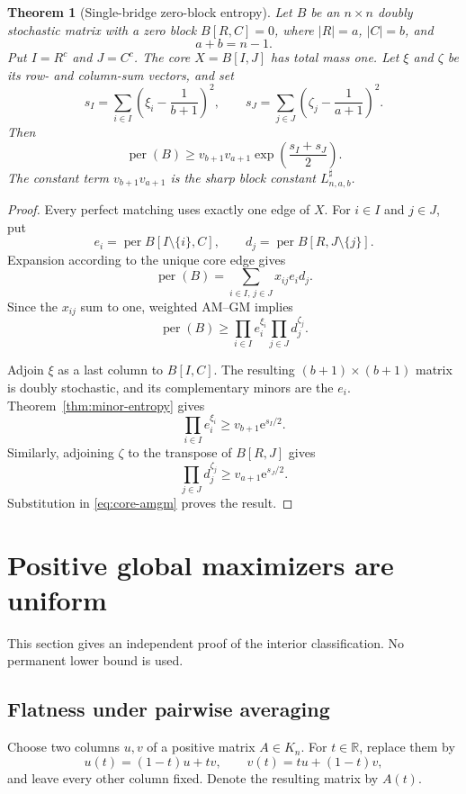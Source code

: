 \documentclass[11pt]{article}
\newtheorem{theorem}{Theorem}[section]
\theoremstyle{definition}
\newcommand{\per}{\operatorname{per}}
\newcommand{\1}{\mathbf{1}}
\newcommand{\e}{\mathrm{e}}
\begin{document}
\begin{theorem}[Single-bridge zero-block entropy]\label{thm:single-bridge-entropy}
Let $B$ be an $n\times n$ doubly stochastic matrix with a zero block
$B[R,C]=0$, where $|R|=a$, $|C|=b$, and
\[
 a+b=n-1.
\]
Put $I=R^c$ and $J=C^c$.  The core $X=B[I,J]$ has total mass one.  Let
$\xi$ and $\zeta$ be its row- and column-sum vectors, and set
\[
 s_I=\sum_{i\in I}\left(\xi_i-\frac1{b+1}\right)^2,
 \qquad
 s_J=\sum_{j\in J}\left(\zeta_j-\frac1{a+1}\right)^2.
\]
Then
\[
 \per(B)
 \ge
 v_{b+1}v_{a+1}\exp\left(\frac{s_I+s_J}{2}\right).
 \tag{3.15}\label{eq:single-bridge-entropy}
\]
The constant term $v_{b+1}v_{a+1}$ is the sharp block constant
$L^{\sharp}_{n,a,b}$.
\end{theorem}

\begin{proof}
Every perfect matching uses exactly one edge of $X$.  For $i\in I$ and
$j\in J$, put
\[
 e_i=\per B[I\setminus\{i\},C],
 \qquad
 d_j=\per B[R,J\setminus\{j\}].
\]
Expansion according to the unique core edge gives
\[
 \per(B)=\sum_{i\in I,\,j\in J}x_{ij}e_i d_j.
\]
Since the $x_{ij}$ sum to one, weighted AM--GM implies
\[
 \per(B)
 \ge
 \prod_{i\in I}e_i^{\xi_i}
 \prod_{j\in J}d_j^{\zeta_j}.
 \tag{3.16}\label{eq:core-amgm}
\]

Adjoin $\xi$ as a last column to $B[I,C]$.  The resulting
$(b+1)\times(b+1)$ matrix is doubly stochastic, and its complementary
minors are the $e_i$.  Theorem~\ref{thm:minor-entropy} gives
\[
 \prod_{i\in I}e_i^{\xi_i}\ge v_{b+1}\e^{s_I/2}.
\]
Similarly, adjoining $\zeta$ to the transpose of $B[R,J]$ gives
\[
 \prod_{j\in J}d_j^{\zeta_j}\ge v_{a+1}\e^{s_J/2}.
\]
Substitution in \eqref{eq:core-amgm} proves the result.
\end{proof}

\section{Positive global maximizers are uniform}\label{sec:positive}

This section gives an independent proof of the interior classification.  No permanent lower bound is used.

\subsection{Flatness under pairwise averaging}

Choose two columns $u,v$ of a positive matrix $A\in K_n$.  For $t\in\mathbb R$, replace them by
\[
 u(t)=(1-t)u+tv,
 \qquad
 v(t)=tu+(1-t)v,
 \tag{4.1}\label{eq:pair-path}
\]
and leave every other column fixed.  Denote the resulting matrix by $A(t)$.
\end{document}
